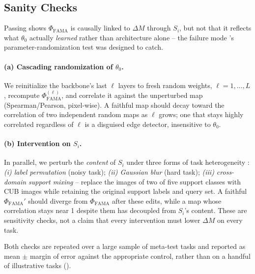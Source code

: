 \subsection{Sanity Checks}
\label{sec:sanity}

Passing \biadt shows $\Phi_{\mathrm{FAMA}}$ is causally linked to $\Delta M$ through $S_i$, but not that it reflects what $\theta_0$ actually \emph{learned} rather than architecture alone -- the failure mode \citet{adebayo2018sanity}'s parameter-randomization test was designed to catch.

\paragraph{(a) Cascading randomization of $\theta_0$.} We reinitialize the backbone's last $\ell$ layers to fresh random weights, $\ell=1,\dots,L$, recompute $\Phi_{\mathrm{FAMA}}^{(\ell)}$, and correlate it against the unperturbed map (Spearman/Pearson, pixel-wise). A faithful map should decay toward the correlation of two independent random maps as $\ell$ grows; one that stays highly correlated regardless of $\ell$ is a disguised edge detector, insensitive to $\theta_0$.

\paragraph{(b) Intervention on $S_i$.} In parallel, we perturb the \emph{content} of $S_i$ under three forms of task heterogeneity \citep{si2025meta}: \emph{(i) label permutation} (noisy task); \emph{(ii) Gaussian blur} (hard task); \emph{(iii) cross-domain support mixing} -- replace the images of two of five support classes with CUB images while retaining the original support labels and query set. A faithful $\Phi_{\mathrm{FAMA}}'$ should diverge from $\Phi_{\mathrm{FAMA}}$ after these edits, while a map whose correlation stays near 1 despite them has decoupled from $S_i$'s content. These are sensitivity checks, not a claim that every intervention must lower $\Delta M$ on every task.

Both checks are repeated over a large sample of meta-test tasks and reported as mean $\pm$ margin of error against the appropriate control, rather than on a handful of illustrative tasks ().
